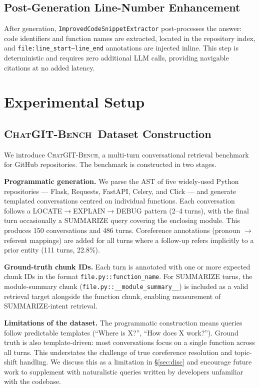 \documentclass[runningheads]{llncs}
\newcommand{\conv}{\textsc{ChatGIT-Bench}\xspace}
\begin{document}
\subsection{Post-Generation Line-Number Enhancement}

After generation, \texttt{ImprovedCodeSnippetExtractor}
post-processes the answer: code identifiers and function names are
extracted, located in the repository index, and
\texttt{file:line\_start--line\_end} annotations are injected
inline. This step is deterministic and requires zero additional
LLM calls, providing navigable citations at no added latency.

\section{Experimental Setup}
\label{sec:eval}

\subsection{\conv\ Dataset Construction}

We introduce \conv, a multi-turn conversational retrieval
benchmark for GitHub repositories. The benchmark is constructed
in two stages.

\textbf{Programmatic generation.} We parse the AST of five
widely-used Python repositories --- Flask, Requests, FastAPI,
Celery, and Click --- and generate templated conversations centred
on individual functions. Each conversation follows a
LOCATE$\to$EXPLAIN$\to$DEBUG pattern (2--4 turns), with the final
turn occasionally a SUMMARIZE query covering the enclosing module.
This produces 150 conversations and 486 turns. Coreference
annotations (pronoun $\to$ referent mappings) are added for
all turns where a follow-up refers implicitly to a prior entity
(111 turns, 22.8\%).

\textbf{Ground-truth chunk IDs.} Each turn is annotated with
one or more expected chunk IDs in the format
\texttt{file.py::function\_name}. For SUMMARIZE turns, the
module-summary chunk (\texttt{file.py::\_\_module\_summary\_\_})
is included as a valid retrieval target alongside the function
chunk, enabling measurement of SUMMARIZE-intent retrieval.

\textbf{Limitations of the dataset.} The programmatic construction
means queries follow predictable templates (``Where is X?'',
``How does X work?''). Ground truth is also template-driven: most
conversations focus on a single function across all turns. This
understates the challenge of true coreference resolution and
topic-shift handling. We discuss this as a limitation in
\S\ref{sec:disc} and encourage future work to supplement with
naturalistic queries written by developers unfamiliar with the
codebase.
\end{document}
